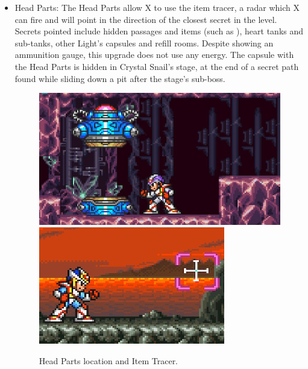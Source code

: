 \begin{itemize}
	\item Head Parts: The Head Parts allow X to use the item tracer, a radar which X can fire and will point in the direction of the closest secret in the level. Secrets pointed include hidden passages and items (such as ), heart tanks and sub-tanks, other Light's capsules and refill rooms. Despite showing an ammunition gauge, this upgrade does not use any energy. The capsule with the Head Parts is hidden in Crystal Snail's stage, at the end of a secret path found while sliding down a pit after the stage's sub-boss.
	\begin{figure}[htp]
		\centering
		\includegraphics[width=0.4\linewidth]{figures/X2/Crystal_snail/Crystal_capsule.jpg}
		\includegraphics[width=0.345\linewidth]{figures/X2/weapons/Tracer.png}
		\caption{Head Parts location and Item Tracer.}
	\end{figure}
	

\end{itemize}
